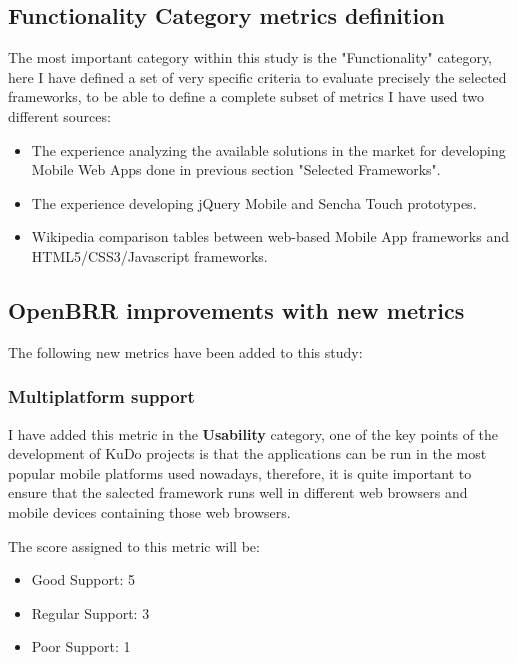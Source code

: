 \documentclass[a4paper,12pt]{book}
\begin{document}
\subsection{Functionality Category metrics definition}
\label{Functionality Category metrics definition}

The most important category within this study is the "Functionality" category, here I have defined a set of very specific criteria to evaluate precisely the selected frameworks, to be able to define a complete subset of metrics I have used two different sources:

\begin{itemize}
 \item The experience analyzing the available solutions in the market for developing Mobile Web Apps done in previous section "Selected Frameworks".
  \item The experience developing jQuery Mobile and Sencha Touch prototypes.
 \item Wikipedia comparison tables between web-based Mobile App frameworks\cite{wikipedia1}  and HTML5/CSS3/Javascript frameworks\cite{wikipedia2}.
\end{itemize}

\subsection{OpenBRR improvements with new metrics}
\label{OpenBRR improvements with new metrics}

The following new metrics have been added to this study:

\subsubsection{Multiplatform support}
\label{Multiplatform support}

I have added this metric in the \textbf{Usability} category, one of the key points of the development of KuDo projects is that the applications can be run in the most popular mobile platforms used nowadays, therefore, it is quite important to ensure that the salected framework runs well in different web browsers and mobile devices containing those web browsers.

The score assigned to this metric will be:
\begin{itemize}
 \item Good Support: 5
 \item Regular Support: 3
 \item Poor Support: 1
\end{itemize}
\end{document}
